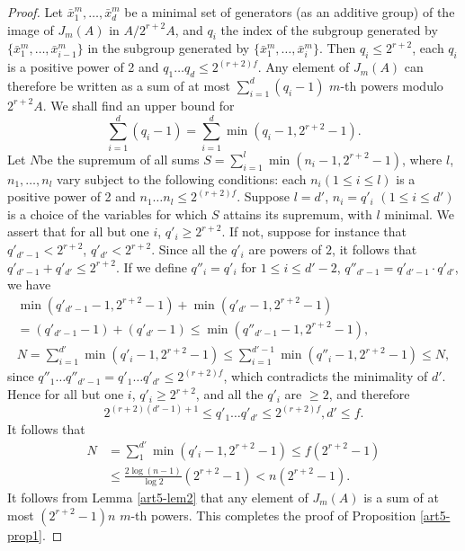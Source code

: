 \begin{proof}
Let $\bar{x}^m_1, \ldots, \bar{x}_d^m$ be a minimal set of generators (as an additive group) of the image of $J_m (A)$ in $A/2^{r+2}A$, and $q_i$ the index of the subgroup generated by $\{\bar{x}^m_1, \ldots, \bar{x}^m_{i-1}\}$ in the subgroup generated by $\{\bar{x}^m_1,\ldots, \bar{x}^m_i\}$. Then $q_i \leq 2^{r+2}$, each $q_i$ is a positive power of 2 and $q_1 \ldots q_d \leq 2^{(r+2)f}$. Any element of $J_m (A)$ can therefore be written as a sum of at most $\sum\limits^d_{i=1} (q_i-1)$ $m$-th powers modulo $2^{r+2} A$. We shall find an upper bound for 
$$
\sum\limits^d_{i=1} (q_i -1) = \sum\limits^d_{i=1} \min (q_i -1, 2^{r+2} -1).
$$
Let $N$\pageoriginale be the supremum of all sums $S = \sum\limits^l_{i=1} \min (n_i -1, 2^{r+2} -1)$, where $l$, $n_1, \ldots, n_l$ vary subject to the following conditions: each $n_i (1\leq i \leq l)$ is a positive power of 2 and $n_1 \ldots n_l \leq 2^{(r+2)f}$. Suppose $l =d'$, $n_i = q'_i$ $(1 \leq i \leq d')$ is a choice of the variables for which $S$ attains its supremum, with $l$ minimal. We assert that for all but one $i$, $q'_i \geq 2^{r+2}$. If not, suppose for instance that $q'_{d'-1} < 2^{r+2}$, $q'_{d'} < 2^{r+2}$. Since all the $q'_i$ are powers of $2$, it follows that $q'_{d'-1} + q'_{d'} \leq 2^{r+2}$. If we define $q''_i = q'_i$ for $1 \leq i \leq d' - 2$, $q''_{d'-1} = q'_{d'-1} \cdot q'_{d'}$, we have
\begin{gather*}
\min (q'_{d'-1} - 1, 2^{r+2} -1) +\min (q'_{d'} -1, 2^{r+2} -1)\\
= (q'_{d'-1} -1) + (q'_{d'} -1) \leq \min (q''_{d'-1} - 1, 2^{r+2} -1 ),\\
N = \sum\limits^{d'}_{i=1} \min (q'_i -1, 2^{r+2} -1) \leq \sum\limits^{d'-1}_{i=1} \min (q''_{i} - 1, 2^{r+2} -1) \leq N,
\end{gather*}
since $q''_1 \ldots q''_{d'-1} = q'_1 \ldots q'_{d'} \leq 2^{(r+2)f}$, which contradicts the minimality of $d'$. Hence for all but one $i$, $q'_i \geq 2^{r+2}$, and all the $q'_i$ are $\geq 2$, and therefore 
$$
2^{(r+2)(d'-1)+1} \leq q'_1 \ldots q'_{d'} \leq 2^{(r+2)f}, d'\leq f.
$$
It follows that 
\begin{align*}
N & = \sum\limits^{d'}_1 \min (q'_i - 1, 2^{r+2} -1) \leq f (2^{r+2} -1)\\
& \leq \frac{2 \log (n-1)}{\log 2} (2^{r+2} -1) < n (2^{r+2} -1).
\end{align*}
It follows from Lemma \ref{art5-lem2} that any element of $J_m (A)$ is a sum of at most $(2^{r+2}-1)n$ $m$-th powers.
This completes the proof of Proposition \ref{art5-prop1}.
\end{proof}

